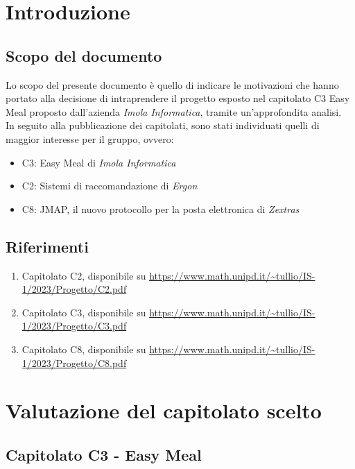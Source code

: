 \documentclass[a4paper, 11pt]{article}
\begin{document}
\pagebreak
\tableofcontents
\pagebreak 

\section{Introduzione}

\subsection{Scopo del documento}
Lo scopo del presente documento è quello di indicare le motivazioni che hanno portato alla decisione di intraprendere il progetto esposto nel capitolato C3 Easy Meal proposto dall'azienda \textit{Imola Informatica}, tramite un'approfondita analisi. \\

In seguito alla pubblicazione dei capitolati, sono stati individuati quelli di maggior interesse per il gruppo, ovvero:
\begin{itemize}
    \item C3: Easy Meal di \textit{Imola Informatica}
    \item C2: Sistemi di raccomandazione di \textit{Ergon}
    \item C8: JMAP, il nuovo protocollo per la posta elettronica di \textit{Zextras}
\end{itemize}

\vspace{10pt}
\subsection{Riferimenti}
\begin{enumerate}
    \item Capitolato C2, disponibile su \url{https://www.math.unipd.it/~tullio/IS-1/2023/Progetto/C2.pdf}
\item Capitolato C3, disponibile su \url{https://www.math.unipd.it/~tullio/IS-1/2023/Progetto/C3.pdf}
\item Capitolato C8, disponibile su \url{https://www.math.unipd.it/~tullio/IS-1/2023/Progetto/C8.pdf}
\end{enumerate}

\pagebreak

\section{Valutazione del capitolato scelto}
\subsection{Capitolato C3 - Easy Meal}
\end{document}
